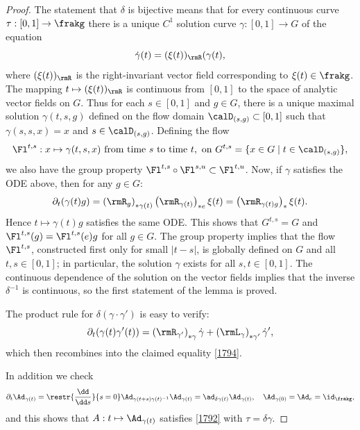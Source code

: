 \begin{proof}
    The statement that $\delta$ is bijective means that for every continuous curve $\tau:[0,1]\to\frakg$ there is a unique $C^1$ solution curve $\gamma:[0,1]\to G$ of the equation
    \[\dot\gamma(t)=(\xi(t))_\rmR(\gamma(t),\]
    where $(\xi(t))_\rmR$ is the right-invariant vector field corresponding to $\xi(t)\in\frakg$. The mapping $t\mapsto (\xi(t))_\rmR$ is continuous from $[0,1]$ to the space of analytic vector fields on $G$. Thus for each $s\in[0,1]$ and $g\in G$, there is a unique maximal solution $\gamma(t,s,g)$ defined on the flow domain $\calD_{(s,g)}\subset [0,1]$ such that $\gamma(s,s,x)=x$ and $s\in \calD_{(s,g)}$. Defining the flow
    \[\Fl^{t,s}:x\mapsto \gamma(t,s,x)\text{ from time }s\text{ to time }t,\text{ on }G^{t,s}=\{x\in G\mid t\in \calD_{(s,g)}\},\]
    we also have the group property $\Fl^{t,s}\circ \Fl^{s,u}\subset \Fl^{t,u}$. Now, if $\gamma$ satisfies the ODE above, then for any $g\in G$:
    \[\partial_t(\gamma(t)g)=\left(\rmR_{g}\right)_{\ast \gamma(t)} \left(\rmR_{\gamma(t)}\right)_{\ast e}\xi(t)=\left(\rmR_{\gamma(t)g}\right)_{\ast}\xi(t).\]
    Hence $t\mapsto \gamma(t)g$ satisfies the same ODE. This shows that $G^{t,s}=G$ and $\Fl^{t,s}(g)=\Fl^{t,s}(e)g$ for all $g\in G$. The group property implies that the flow $\Fl^{t,s}$, constructed first only for small $|t-s|$, is globally defined on $G$ and all $t,s\in[0,1]$; in particular, the solution $\gamma$ exists for all $s,t\in [0,1]$. The continuous dependence of the solution on the vector fields implies that the inverse $\delta^{-1}$ is continuous, so the first statement of the lemma is proved.

    The product rule for $\delta(\gamma\cdot\gamma')$ is easy to verify:
    \[\partial_t(\gamma(t)\gamma'(t))=\left(\rmR_{\gamma'}\right)_{\ast \gamma}\dot\gamma+ \left(\rmL_{\gamma}\right)_{\ast \gamma'}\dot\gamma',\]
    which then recombines into the claimed equality \eqref{1794}.

    In addition we check 
    \[\partial_t \Ad_{\gamma(t)}=\restr{\frac{\dd}{\dd s}}{s=0}\Ad_{\gamma(t+s)\gamma(t)^{-1}}\Ad_{\gamma(t)}=\ad_{\delta \gamma(t)}\Ad_{\gamma(t)},\quad \Ad_{\gamma(0)}=\Ad_e=\id_\frakg,\]
    and this shows that $A:t\mapsto \Ad_{\gamma(t)}$ satisfies \eqref{1792} with $\tau=\delta\gamma$.


\end{proof}

